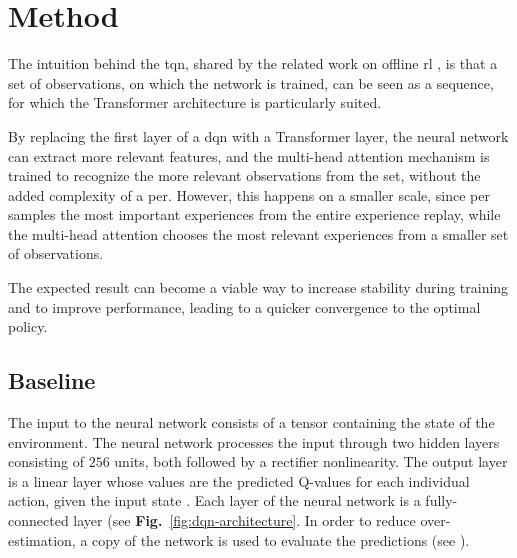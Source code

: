 \section{Method} \label{section:method}

The intuition behind the \acrshort{tqn}, shared by the related work on offline \acrshort{rl} \cite{decision_transformer,q_transformer}, is that a set of observations, on which the network is trained, can be seen as a sequence, for which the Transformer architecture is particularly suited.

By replacing the first layer of a \acrshort{dqn} with a Transformer layer, the neural network can extract more relevant features, and the multi-head attention mechanism is trained to recognize the more relevant observations from the set, without the added complexity of a \acrshort{per}. However, this happens on a smaller scale, since \acrshort{per} samples the most important experiences from the entire experience replay, while the multi-head attention chooses the most relevant experiences from a smaller set of observations.

The expected result can become a viable way to increase stability during training and to improve performance, leading to a quicker convergence to the optimal policy.

\subsection{Baseline}
The input to the neural network consists of a tensor containing the state of the environment. The neural network processes the input through  two hidden layers consisting of $256$ units, both followed by a rectifier nonlinearity. The output layer is a linear layer whose values are the predicted Q-values for each individual action, given the input state \cite{dqn1,dqn2}. Each layer of the neural network is a fully-connected layer (see \textbf{Fig.}~\ref{fig:dqn-architecture}. In order to reduce over-estimation, a copy of the network is used to evaluate the predictions (see ).


